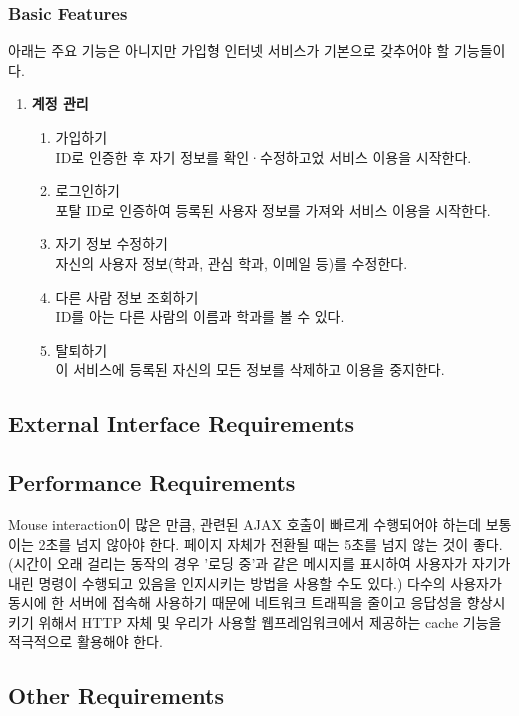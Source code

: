 \documentclass[a4paper,titlepage]{article}
\begin{document}
\subsubsection{Basic Features}
아래는 주요 기능은 아니지만 가입형 인터넷 서비스가 기본으로 갖추어야 할 기능들이다.
\begin{enumerate}
	\item\textbf{계정 관리}
	\begin{enumerate}
		\item 가입하기\\
		ID로 인증한 후 자기 정보를 확인·수정하고었 서비스 이용을 시작한다. 
		\item 로그인하기\\ 
		포탈 ID로 인증하여 등록된 사용자 정보를 가져와 서비스 이용을 시작한다. 
		\item 자기 정보 수정하기\\
		자신의 사용자 정보(학과, 관심 학과, 이메일 등)를 수정한다. 
		\item 다른 사람 정보 조회하기\\
		ID를 아는 다른 사람의 이름과 학과를 볼 수 있다. 
		\item 탈퇴하기\\
		이 서비스에 등록된 자신의 모든 정보를 삭제하고 이용을 중지한다. 
	\end{enumerate}
\end{enumerate}

\subsection{External Interface Requirements}

\subsection{Performance Requirements}
Mouse interaction이 많은 만큼, 관련된 AJAX 호출이 빠르게 수행되어야 하는데 보통 이는 2초를 넘지 않아야 한다.
페이지 자체가 전환될 때는 5초를 넘지 않는 것이 좋다.
(시간이 오래 걸리는 동작의 경우 '로딩 중'과 같은 메시지를 표시하여 사용자가 자기가 내린 명령이 수행되고 있음을 인지시키는 방법을 사용할 수도 있다.)
다수의 사용자가 동시에 한 서버에 접속해 사용하기 때문에 네트워크 트래픽을 줄이고 응답성을 향상시키기 위해서 HTTP 자체 및 우리가 사용할 웹프레임워크에서 제공하는 cache 기능을 적극적으로 활용해야 한다.

\subsection{Other Requirements}
\end{document}
